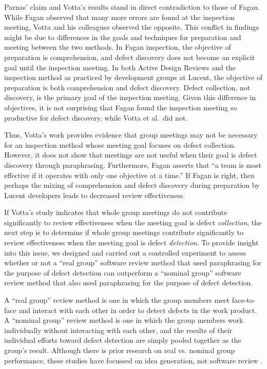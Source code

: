 Parnas' claim and Votta's results stand in direct contradiction to those of
Fagan.  While Fagan observed that many more errors are found at the
inspection meeting, Votta and his colleagues observed the opposite.  This
conflict in findings might be due to differences in the goals and
techniques for preparation and meeting between the two methods.  In Fagan
inspection, the objective of preparation is comprehension, and defect
discovery does not become an explicit goal until the inspection meeting. In
both Active Design Reviews and the inspection method as practiced by
development groups at Lucent, the objective of preparation is both
comprehension and defect discovery. Defect collection, not discovery, is
the primary goal of the inspection meeting.  Given this difference in
objectives, it is not surprising that Fagan found the inspection meeting so
productive for defect discovery, while Votta et al.~did not.

Thus, Votta's work provides evidence that group meetings may not be
necessary for an inspection method whose meeting goal focuses on defect
collection. However, it does not show that meetings are not useful when
their goal is defect discovery through paraphrasing. Furthermore, Fagan
asserts that ``a team is most effective if it operates with only one
objective at a time.''  If Fagan is right, then perhaps the mixing of
comprehension and defect discovery during preparation by Lucent
developers leads to decreased review effectiveness.

If Votta's study indicates that whole group meetings do not contribute
significantly to review effectiveness when the meeting goal is defect {\em
  collection}, the next step is to determine if whole group meetings
contribute significantly to review effectiveness when the meeting goal is
defect {\em detection}.  To provide insight into this issue, we designed
and carried out a controlled experiment to assess whether or not a
``real group'' software review method that used paraphrasing for the
purpose of defect detection can outperform a ``nominal group'' software
review method that also used paraphrasing for the purpose of defect
detection.  

A ``real group'' review method is one in which the group members meet
face-to-face and interact with each other in order to detect defects in the
work product. A ``nominal group'' review method is one in which the group
members work individually without interacting with each other, and the
results of their individual efforts toward defect detection are simply
pooled together as the group's result.  Although there is prior research on
real vs. nominal group performance, these studies have focussed on idea
generation, not software review \cite{Diehl87,Mullen91}.

